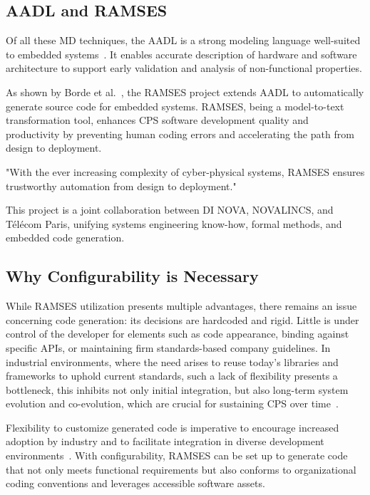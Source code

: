 \subsection{AADL and RAMSES}

Of all these \gls{MD} techniques, the \gls{AADL} is a strong modeling language well-suited to embedded systems~\cite{Feiler_Lewis_Vestal_2006}. It enables accurate description of hardware and software architecture to support early validation and analysis of non-functional properties.
\par
As shown by Borde et al.~\cite{Borde_Rahmoun_Cadoret_Pautet_Singhoff_Dissaux_2014}, the \gls{RAMSES} project extends \gls{AADL} to automatically generate source code for embedded systems. \gls{RAMSES}, being a model-to-text transformation tool, enhances \gls{CPS} software development quality and productivity by preventing human coding errors and accelerating the path from design to deployment.

\begin{tcolorbox}[colback=green!8]
	"With the ever increasing complexity of cyber-physical systems, \gls{RAMSES} ensures trustworthy automation from design to deployment."
\end{tcolorbox}

This project is a joint collaboration between \gls{DI} NOVA, NOVALINCS, and Télécom Paris, unifying systems engineering know-how, formal methods, and embedded code generation.


\subsection{Why Configurability is Necessary}

While \gls{RAMSES} utilization presents multiple advantages, there remains an issue concerning code generation: its decisions are hardcoded and rigid. Little is under control of the developer for elements such as code appearance, binding against specific APIs, or maintaining firm standards-based company guidelines. In industrial environments, where the need arises to reuse today's libraries and frameworks to uphold current standards, such a lack of flexibility presents a bottleneck, this inhibits not only initial integration, but also long-term system evolution and co-evolution, which are crucial for sustaining \gls{CPS} over time~\cite{Czarnecki_Helsen_2006}.
\par
Flexibility to customize generated code is imperative to encourage increased adoption by industry and to facilitate integration in diverse development environments~\cite{Mikova_2025}. With configurability, \gls{RAMSES} can be set up to generate code that not only meets functional requirements but also conforms to organizational coding conventions and leverages accessible software assets.

